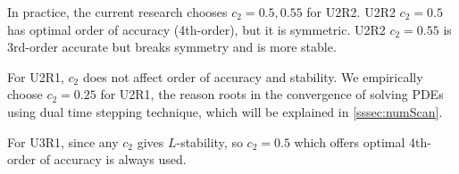 In practice, the current research chooses $c_2=0.5,0.55$ for U2R2.
U2R2 $c_2=0.5$ has optimal order of accuracy (4th-order), but it is symmetric.
U2R2 $c_2=0.55$ is 3rd-order accurate but breaks symmetry and is more stable.

For U2R1, $c_2$ does not affect order of accuracy and stability.
We empirically choose $c_2=0.25$ for U2R1, the reason roots in
the convergence of solving PDEs using
dual time stepping technique, which will be explained in \ref{sssec:numScan}.

For U3R1, since any $c_2$ gives $L$-stability, so $c_2=0.5$ which
offers optimal 4th-order of accuracy is always used.








